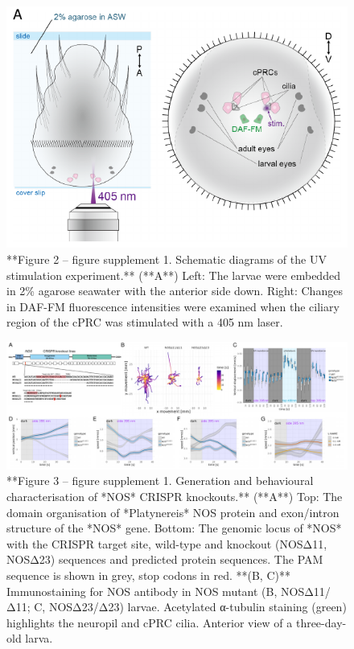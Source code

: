 \documentclass[
  10pt,
  onecolumn]{article}
\begin{document}
\begin{figure}
\includegraphics[width=16.67in]{figures/Fig2_sup1} \caption{**Figure 2 -- figure supplement 1. Schematic diagrams of the UV stimulation experiment.** (**A**) Left: The larvae were embedded in 2\% agarose seawater with the anterior side down. Right: Changes in DAF-FM fluorescence intensities were examined when the ciliary region of the cPRC was stimulated with a 405 nm laser.}\label{fig:unnamed-chunk-12}
\end{figure}

\begin{figure}
\includegraphics[width=33.33in]{figures/Fig3_sup1} \caption{**Figure 3 -- figure supplement 1. Generation and behavioural characterisation of *NOS* CRISPR knockouts.** (**A**) Top: The domain organisation of *Platynereis* NOS protein and exon/intron structure of the *NOS* gene. Bottom: The genomic locus of *NOS* with the CRISPR target site, wild-type and knockout (NOSΔ11, NOSΔ23) sequences and predicted protein sequences. The PAM sequence is shown in grey, stop codons in red. **(B, C)** Immunostaining for NOS antibody in NOS mutant (B, NOSΔ11/Δ11; C, NOSΔ23/Δ23) larvae. Acetylated α-tubulin staining (green) highlights the neuropil and cPRC cilia. Anterior view of a three-day-old larva.}\label{fig:unnamed-chunk-13}
\end{figure}
\end{document}
